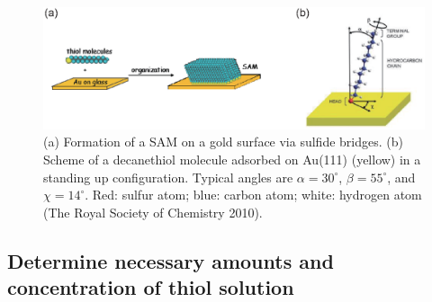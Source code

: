 \begin{figure}[h]
\centering
\includegraphics[width=0.9\columnwidth]{sam.eps}
\caption{(a) Formation of a SAM on a gold surface via sulfide bridges. (b) Scheme of a decanethiol molecule adsorbed on Au(111) (yellow) in a standing up configuration. Typical angles are $\alpha=30^\circ$, $\beta=55^\circ$, and $\chi=14^\circ$. Red: sulfur atom; blue: carbon atom; white: hydrogen atom (The Royal Society of Chemistry 2010).}
\label{sam1}
\end{figure}

\subsection{Determine necessary amounts and concentration of thiol solution}

